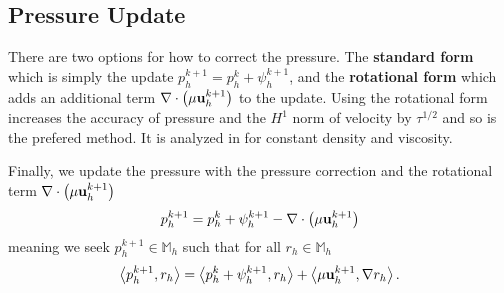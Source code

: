 \documentclass[letterpaper]{erdc}
\begin{document}
%
%
\subsection{Pressure Update}\label{sec:bdf2pressureupdate}
\begin{remark}
  There are two options for how to correct the pressure.  The \textbf{standard form} which is simply the update $p_h^{k+1} = p_h^{k} + \psi_h^{k+1}$, and the \textbf{rotational form} which adds an additional term $\nabla\cdot\left(\mu\textbf{u}^{k+1}_h\right)$ to the update.  Using the rotational form increases the accuracy of pressure and the $H^1$ norm of velocity by $\tau^{1/2}$ and so is the prefered method.  It is analyzed in \cite{guermond2004error} for constant density and viscosity.
\end{remark}
Finally, we update the pressure with the pressure correction and the rotational term $\nabla\cdot\left(\mu\textbf{u}^{k+1}_h\right)$
\begin{equation}
  p_h^{k+1} = p_h^{k} + \psi_h^{k+1} - \nabla\cdot\left(\mu\textbf{u}^{k+1}_h\right)
\end{equation}
meaning we seek $p_h^{k+1}\in \mathbb{M}_h$ such that for all $r_h\in \mathbb{M}_h$
\begin{equation}
  \left\langle p_h^{k+1}, r_h \right\rangle = \left\langle p_h^{k} + \psi_h^{k+1}, r_h \right\rangle + \left\langle \mu\textbf{u}_h^{k+1}, \nabla r_h \right\rangle.
\end{equation}
\end{document}
